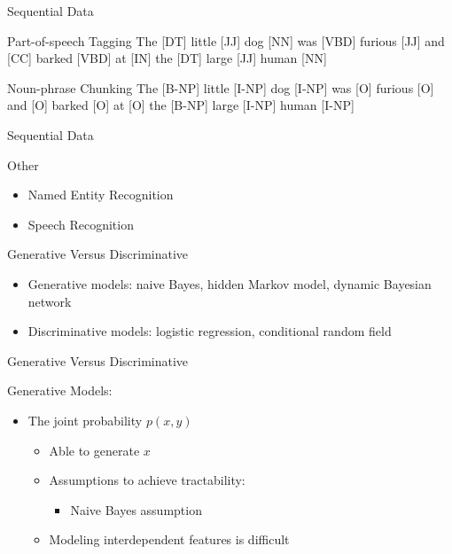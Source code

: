 \documentclass[presentation,bigger]{beamer}
\begin{document}
\begin{frame}[label={sec:orgheadline2}]{Sequential Data}
\begin{block}{Part-of-speech Tagging}
The \alert{[DT]} little \alert{[JJ]} dog \alert{[NN]} was \alert{[VBD]} furious \alert{[JJ]} and \alert{[CC]} barked \alert{[VBD]} at \alert{[IN]} the \alert{[DT]} large \alert{[JJ]} human \alert{[NN]}
\end{block}
\begin{block}{Noun-phrase Chunking}
The \alert{[B-NP]} little \alert{[I-NP]} dog \alert{[I-NP]} was \alert{[O]} furious \alert{[O]} and \alert{[O]} barked \alert{[O]} at \alert{[O]} the \alert{[B-NP]} large \alert{[I-NP]} human \alert{[I-NP]}
\end{block}
\end{frame}
\begin{frame}[label={sec:orgheadline3}]{Sequential Data}
\begin{block}{Other}
\begin{itemize}
\item Named Entity Recognition
\item Speech Recognition
\end{itemize}
\end{block}
\end{frame}
\begin{frame}[label={sec:orgheadline4}]{Generative Versus Discriminative}
\begin{itemize}
\item Generative models: naive Bayes, hidden Markov model, dynamic Bayesian network
\item Discriminative models: logistic regression, conditional random field
\end{itemize}
\end{frame}
\begin{frame}[label={sec:orgheadline5}]{Generative Versus Discriminative}
\begin{block}{Generative Models:}
\begin{itemize}
\item The joint probability \(p(x,y)\)
\begin{itemize}
\item Able to generate \(x\)
\item Assumptions to achieve tractability:
\begin{itemize}
\item Naive Bayes assumption
\end{itemize}
\item Modeling interdependent features is difficult
\end{itemize}
\end{itemize}
\end{block}
\end{frame}
\end{document}
